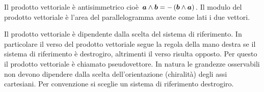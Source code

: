 Il prodotto vettoriale è antisimmetrico cioè $\boldsymbol{a} \wedge \boldsymbol{b}=-\left(\boldsymbol{b} \wedge \boldsymbol{a}\right)$. Il modulo del prodotto
vettoriale è l'area del parallelogramma avente come lati i due
vettori.

Il prodotto vettoriale è dipendente dalla scelta del sistema di riferimento. In particolare il verso del prodotto vettoriale segue la regola della mano destra se il sistema di riferimento è destrogiro, altrimenti il verso risulta opposto. Per questo il prodotto vettoriale è chiamato pseudovettore. In natura le grandezze osservabili non devono dipendere dalla scelta dell'orientazione (chiralità) degli assi cartesiani. Per convenzione si sceglie un sistema di riferimento destrogiro.
\begin{figure}[htbp]
\centering
{}

\end{figure}
